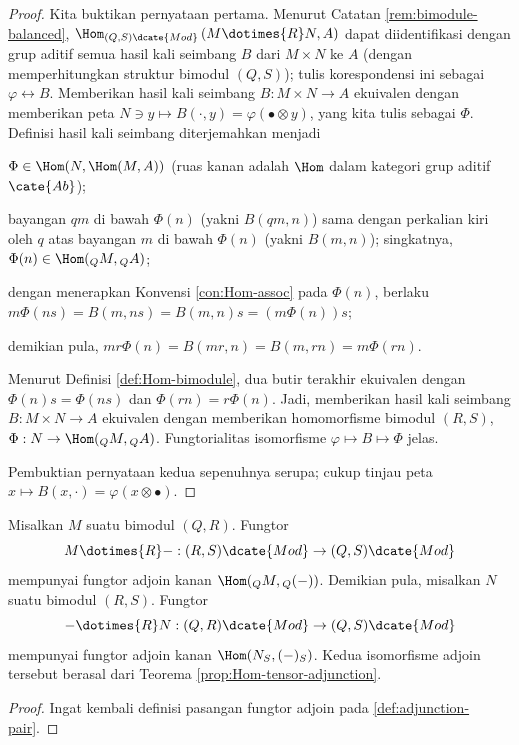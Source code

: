 \begin{proof}
	Kita buktikan pernyataan pertama. Menurut Catatan \ref{rem:bimodule-balanced}, $\Hom_{(Q,S)\dcate{Mod}} \left( M \dotimes{R} N, A \right)$ dapat diidentifikasi dengan grup aditif semua hasil kali seimbang $B$ dari $M \times N$ ke $A$ (dengan memperhitungkan struktur bimodul $(Q, S)$); tulis korespondensi ini sebagai $\varphi \leftrightarrow B$. Memberikan hasil kali seimbang $B: M \times N \to A$ ekuivalen dengan memberikan peta $N \ni y \mapsto B(\cdot, y) = \varphi(\bullet \otimes y)$, yang kita tulis sebagai $\Phi$. Definisi hasil kali seimbang diterjemahkan menjadi
	\begin{compactitem}
		\item $\Phi \in \Hom(N, \Hom(M, A))$ (ruas kanan adalah $\Hom$ dalam kategori grup aditif $\cate{Ab}$);
		\item bayangan $qm$ di bawah $\Phi(n)$ (yakni $B(qm, n)$) sama dengan perkalian kiri oleh $q$ atas bayangan $m$ di bawah $\Phi(n)$ (yakni $B(m, n)$); singkatnya, $\Phi(n) \in \Hom({}_Q M, {}_Q A)$;
		\item dengan menerapkan Konvensi \ref{con:Hom-assoc} pada $\Phi(n)$, berlaku $ m \Phi(ns) = B(m, ns) = B(m, n)s = (m\Phi(n))s$;
		\item demikian pula, $mr \Phi(n) = B(mr, n) = B(m, rn) = m\Phi(rn)$.
	\end{compactitem}

	Menurut Definisi \ref{def:Hom-bimodule}, dua butir terakhir ekuivalen dengan $\Phi(n)s = \Phi(ns)$ dan $\Phi(rn) = r\Phi(n)$. Jadi, memberikan hasil kali seimbang $B: M \times N \to A$ ekuivalen dengan memberikan homomorfisme bimodul $(R,S)$, $\Phi: N \to \Hom({}_Q M, {}_Q A)$. Fungtorialitas isomorfisme $\varphi \mapsto B \mapsto \Phi$ jelas.

	Pembuktian pernyataan kedua sepenuhnya serupa; cukup tinjau peta $x \mapsto B(x, \cdot) = \varphi(x \otimes \bullet)$.
\end{proof}

\begin{corollary}
	Misalkan $M$ suatu bimodul $(Q, R)$. Fungtor
	\[ M \dotimes{R} -: (R, S)\dcate{Mod} \to (Q, S)\dcate{Mod} \]
	mempunyai fungtor adjoin kanan $\Hom({}_Q M, {}_Q (-))$. Demikian pula, misalkan $N$ suatu bimodul $(R, S)$. Fungtor
	\[ - \dotimes{R} N: (Q, R)\dcate{Mod} \to (Q, S)\dcate{Mod} \]
	mempunyai fungtor adjoin kanan $\Hom(N_S, (-)_S)$. Kedua isomorfisme adjoin tersebut berasal dari Teorema \ref{prop:Hom-tensor-adjunction}.
\end{corollary}
\begin{proof}
	Ingat kembali definisi pasangan fungtor adjoin pada \ref{def:adjunction-pair}.
\end{proof}

